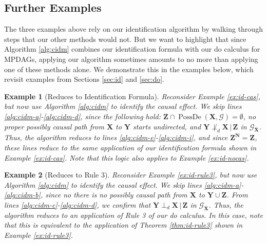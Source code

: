 \documentclass[11pt]{article}
\DeclareMathOperator{\PossDe}{PossDe}
\newtheorem{example}{Example}
\newcommand{\mb}[1]{\mathbf{#1}}
\newcommand{\dsepp}{\perp_{d}}
\newcommand{\g}[1][G]{\mathcal{#1}}
\begin{document}

\subsection{Further Examples}

The three examples above rely on our identification algorithm by walking through steps that our other methods would not. But we want to highlight that since Algorithm \ref{alg:cidm} combines our identification formula with our do calculus for MPDAGs, applying our algorithm sometimes amounts to no more than applying one of these methods alone. We demonstrate this in the examples below, which revisit examples from Sections \ref{sec:id} and \ref{sec:do}.


\begin{example}[Reduces to Identification Formula]
    Reconsider Example \ref{ex:id-cas}, but now use Algorithm \ref{alg:cidm} to identify the causal effect. We skip lines \ref{alg:cidm-a}-\ref{alg:cidm-d}, since the following hold: $\mb{Z} \cap \PossDe(\mb{X}, \g) = \emptyset$, no proper possibly causal path from $\mb{X}$ to $\mb{Y}$ starts undirected, and $\mb{Y} \not\dsepp \mb{X} \,|\, \mb{Z}$ in $\g_{\overline{\mb{X}}}$. Thus, the algorithm reduces to lines \ref{alg:cidm-e}-\ref{alg:cidm-i}, and since $\mb{Z^N}=\mb{Z}$, these lines reduce to the same application of our identification formula shown in Example \ref{ex:id-cas}. Note that this logic also applies to Example \ref{ex:id-nocas}.
\end{example}


\begin{example}[Reduces to Rule 3]
    Reconsider Example \ref{ex:id-rule3}, but now use Algorithm \ref{alg:cidm} to identify the causal effect. We skip lines \ref{alg:cidm-a}-\ref{alg:cidm-b}, since no there is no possibly causal path from $\mb{X}$ to $\mb{Y} \cup \mb{Z}$. From lines \ref{alg:cidm-c}-\ref{alg:cidm-d}, we confirm that $\mb{Y} \dsepp \mb{X} \,|\, \mb{Z}$ in $\g_{\overline{\mb{X}}}$. Thus, the algorithm reduces to an application of Rule 3 of our do calculus. In this case, note that this is equivalent to the application of Theorem \ref{thm:id-rule3} shown in Example \ref{ex:id-rule3}.
\end{example}
\end{document}
